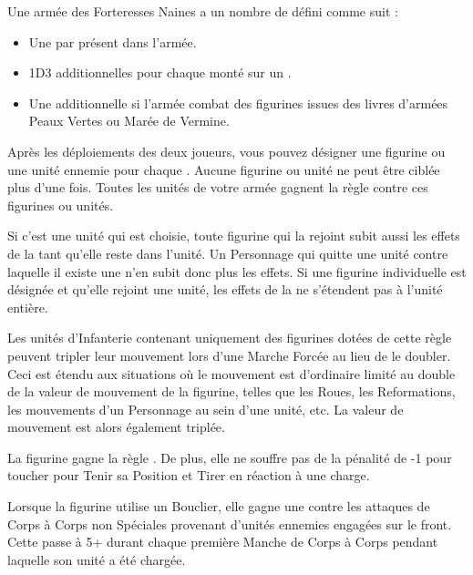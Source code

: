 Une armée des Forteresses Naines a un nombre de \ancientgrudges{} défini comme suit :
\begin{itemize}[label={-}]
\item Une \ancientgrudge{} par \king{} présent dans l'armée.
\item 1D3 \ancientgrudges{} additionnelles pour chaque \king{} monté sur un \warthrone{}.
\item Une \ancientgrudge{} additionnelle si l'armée combat des figurines issues des livres d'armées Peaux Vertes ou Marée de Vermine.
\end{itemize}

Après les déploiements des deux joueurs, vous pouvez désigner une figurine ou une unité ennemie pour chaque \ancientgrudge{}. Aucune figurine ou unité ne peut être ciblée plus d'une fois. Toutes les unités de votre armée gagnent la règle \hatred{} contre ces figurines ou unités.

Si c'est une unité qui est choisie, toute figurine qui la rejoint subit aussi les effets de la \ancientgrudge{} tant qu'elle reste dans l'unité. Un Personnage qui quitte une unité contre laquelle il existe une \ancientgrudge{} n'en subit donc plus les effets. Si une figurine individuelle est désignée et qu'elle rejoint une unité, les effets de la \ancientgrudge{} ne s'étendent pas à l'unité entière. 

\closearmywiderules



\vspace*{1.5cm}
\startarmyspecialrules

\armyspecialruleentry{\relentless}

Les unités d'Infanterie contenant uniquement des figurines dotées de cette règle peuvent tripler leur mouvement lors d'une Marche Forcée au lieu de le doubler. Ceci est étendu aux situations où le mouvement est d'ordinaire limité au double de la valeur de mouvement de la figurine, telles que les Roues, les Reformations, les mouvements d'un Personnage au sein d'une unité, etc. La valeur de mouvement est alors également triplée.

\armyspecialruleentry{\sturdy}

La figurine gagne la règle \thunderouscharge{}. De plus, elle ne souffre pas de la pénalité de -1 pour toucher pour Tenir sa Position et Tirer en réaction à une charge. 

\armyspecialruleentry{\shieldwall}

Lorsque la figurine utilise un Bouclier, elle gagne une  contre les attaques de Corps à Corps non Spéciales provenant d'unités ennemies engagées sur le front. Cette \wardsave{} passe à 5+ durant chaque première Manche de Corps à Corps pendant laquelle son unité a été chargée. 

